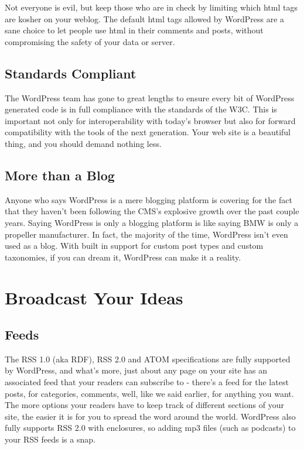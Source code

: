Not everyone is evil, but keep those who are in check by limiting which html tags are kosher on your weblog. The default html tags allowed by WordPress are a sane choice to let people use html in their comments and posts, without compromising the safety of your data or server.

\subsection{Standards Compliant}

The WordPress team has gone to great lengths to ensure every bit of WordPress generated code is in full compliance with the standards of the W3C. This is important not only for interoperability with today’s browser but also for forward compatibility with the tools of the next generation. Your web site is a beautiful thing, and you should demand nothing less.

\subsection{More than a Blog}
 
Anyone who says WordPress is a mere blogging platform is covering for the fact that they haven’t been following the CMS’s explosive growth over the past couple years. Saying WordPress is only a blogging platform is like saying BMW is only a propeller manufacturer. In fact, the majority of the time, WordPress isn’t even used as a blog. With built in support for custom post types and custom taxonomies, if you can dream it, WordPress can make it a reality.


\section{Broadcast Your Ideas}


\subsection{Feeds}

The RSS 1.0 (aka RDF), RSS 2.0 and ATOM specifications are fully supported by WordPress, and what's more, just about any page on your site has an associated feed that your readers can subscribe to - there's a feed for the latest posts, for categories, comments, well, like we said earlier, for anything you want. The more options your readers have to keep track of different sections of your site, the easier it is for you to spread the word around the world. WordPress also fully supports RSS 2.0 with enclosures, so adding mp3 files (such as podcasts) to your RSS feeds is a snap.


